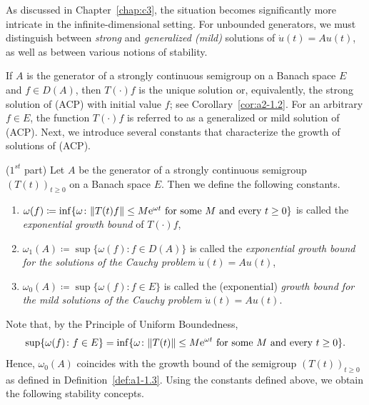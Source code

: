 As discussed in Chapter~\ref{chap:c3}, the situation becomes significantly more intricate in the infinite-dimensional setting. 
For unbounded generators, we must distinguish between \emph{strong} and \emph{generalized (mild)} solutions of\/ $\dot{u}(t) = Au(t)$, as well as between various notions of stability.

If\/ $A$ is the generator of a strongly continuous semigroup on a Banach space $E$ and $f \in D(A)$, then $T(\cdot)f$ is the unique solution or, equivalently, the strong solution of (ACP) with initial value $f$; 
see Corollary~\ref{cor:a2-1.2}.
For an arbitrary $f \in E$, the function $T(\cdot)f$ is referred to as a generalized or mild solution of (ACP). 
Next, we introduce several constants that characterize the growth of solutions of (ACP).
\begin{definition}($1^{st}$ part)\label{def:a4-1.1} 
Let $A$ be the generator of a strongly continuous semigroup $ (T(t))_{t \geq 0} $ on a Banach space $E$. 
Then we define the following constants.
\begin{enumerate}[\upshape (i)]
\item 
$\omega(f) \coloneq \inf\{\omega \colon \|T(t)f\| \leq M\eu^{\omega t} \text{ for some } M \text{ and every } t \geq 0\}$ is called the \emph{exponential growth bound} of\/ $T(\cdot)f$,

\item 
$\omega_{1}(A) \coloneq \sup\{\omega(f) \colon f \in D(A)\}$ is called the \emph{exponential growth bound for the solutions of the Cauchy problem} $\dot{u}(t) = Au(t)$,

\item 
$\omega_{0}(A) \coloneq \sup\{\omega(f) \colon f \in E\}$ is called the (exponential) \emph{growth bound for the mild solutions of the Cauchy problem} $\dot{u}(t) = Au(t)$.
\end{enumerate}
\end{definition}
Note that, by the Principle of Uniform Boundedness, 
\[
\sup\{\omega(f) \colon f \in E\} 
= \inf \{ \omega \colon \|T(t)\| \leq M\eu^{\omega t} 
    \text{ for some $M$ and every $t \geq 0 $}\}.
\]
Hence, $\omega_{0}(A)$ coincides with the growth bound of the semigroup $(T(t))_{t \geq 0}$ as defined in Definition~\ref{def:a1-1.3}. 
Using the constants defined above, we obtain the following stability concepts.
\setcounter{theorem}{0}
